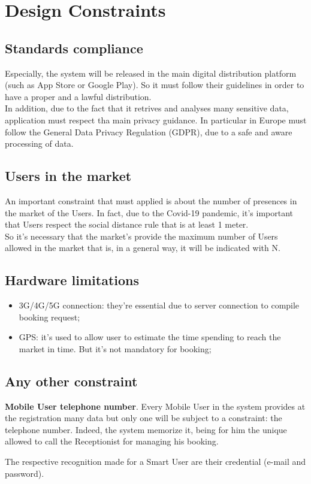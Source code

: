 \section{Design Constraints}
\subsection{Standards compliance}
Especially, the system will be released in the main digital distribution platform (such as App Store or Google Play). So it must follow their guidelines in order to have a proper and a lawful distribution. \\
In addition, due to the fact that it retrives and analyses many sensitive data, application must respect tha main privacy guidance. In particular in Europe must follow the General Data Privacy Regulation (GDPR), due to a safe and aware processing of data. 
\par
\subsection{Users in the market}
An important constraint that must applied is about the number of presences in the market of the Users. In fact, due to the Covid-19 pandemic, it's important that Users respect the social distance rule that is at least 1 meter.\\
So it's necessary that the market's provide the maximum number of Users allowed in the market that is, in a general way, it will be indicated with N.
\par
\subsection{Hardware limitations}
\begin{itemize}
\item 3G/4G/5G connection: they're essential due to server connection to compile booking request;
\item GPS: it's used to allow user to estimate the time spending to reach the market in time. But it's not mandatory for booking;
\end{itemize}
\subsection{Any other constraint}

\textbf{Mobile User telephone number}. Every Mobile User in the system provides at the registration many data but only one will be subject to a constraint: the telephone number. Indeed, the system memorize it, being for him the unique allowed to call the Receptionist for managing his booking. \par
The respective recognition made for a Smart User are their credential (e-mail and password).


